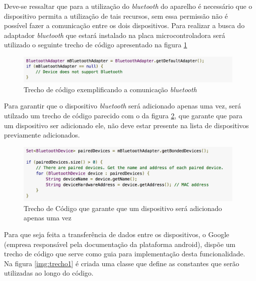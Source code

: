 	  Deve-se ressaltar que para a utilização do \textit{bluetooth} do aparelho é necessário que o dispositivo permita a utilização de tais recursos, sem essa permissão não é possível fazer a comunicação entre os dois dispositivos.  
  	Para realizar a busca do adaptador \textit{bluetooth} que estará instalado na placa microcontroladora será utilizado o seguinte trecho de código apresentado na figura \ref{img:bluetooth_enabled}
  	
  	\graphicspath{{figuras/}}
  	\begin{figure}[h!]
  	\centering
  	\includegraphics[scale=0.60]{bluetooth_enabled}
  	\caption{Trecho de código exemplificando a comunicação \textit{bluetooth}}
  	\label{img:bluetooth_enabled}
  	\end{figure}
  	
  	Para garantir que o dispositivo \textit{bluetooth} será adicionado apenas uma vez, será utilzado um trecho de código parecido com o da figura \ref{img:bluetooth_devices}, que garante que para um dispositivo ser adicionado ele, não deve estar presente na lista de dispositivos previamente adicionados.
  	
  	\graphicspath{{figuras/}}
  	\begin{figure}[h]
  	\centering
  	\includegraphics[scale=0.60]{bluetooth_paired_devices}
  	\caption{Trecho de Código que garante que um dispositivo será adicionado apenas uma vez}
  	\label{img:bluetooth_devices}
  	\end{figure}
  	
  	Para que seja feita a transferência de dados entre os dispositivos, o Google (empresa responsável pela documentação da plataforma android), dispõe um trecho de código que serve como guia para implementação desta funcionalidade. Na figura \ref{img:trecho1} é criada uma classe que define as constantes que serão utilizadas ao longo do código.
  	
